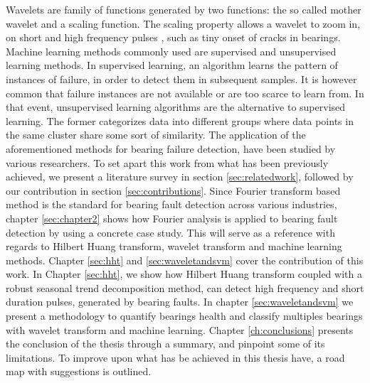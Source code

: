 \documentclass[../Main/thesis.tex]{subfiles}
\begin{document}
Wavelets are family of functions generated by two functions: the so called mother wavelet and a scaling function. The scaling property allows a wavelet to zoom in, on short and high frequency pulses \cite{albert09},
such as tiny onset of cracks in bearings.
\justify
Machine learning methods commonly used are supervised and unsupervised learning methods. In supervised learning, an algorithm learns the pattern of instances of failure, in order to detect them in subsequent samples. It is however common that failure instances are not available or are too scarce to learn from. In that event, unsupervised learning algorithms are the alternative to supervised learning. The former categorizes data into different groups where data points in the same cluster share some sort of similarity.
\justify
 The application of the aforementioned methods for bearing failure detection, have been studied by various researchers. 
To set apart this work from what has been previously achieved, we present a literature survey in section \ref{sec:relatedwork}, followed by our contribution in section \ref{sec:contributions}. Since Fourier transform based method is the standard for bearing fault detection across various industries, chapter \ref{sec:chapter2} shows how Fourier analysis is applied to bearing fault detection by using a concrete case study. This will serve as a reference with regards to Hilbert Huang transform, wavelet transform and machine learning methods.
\justify
Chapter \ref{sec:hht} and \ref{sec:waveletandsvm} cover the contribution of this work. In Chapter \ref{sec:hht}, we show how Hilbert Huang transform coupled with a robust seasonal trend decomposition method, can detect high frequency and short duration pulses, generated by bearing faults. In chapter \ref{sec:waveletandsvm} we present a methodology to quantify bearings health and classify multiples bearings with wavelet transform and machine learning. Chapter \ref{ch:conclusions} presents the conclusion of the thesis through a summary, and pinpoint some of its limitations. To improve upon what has be achieved in this thesis have, a road map with suggestions is outlined.

\end{document}
